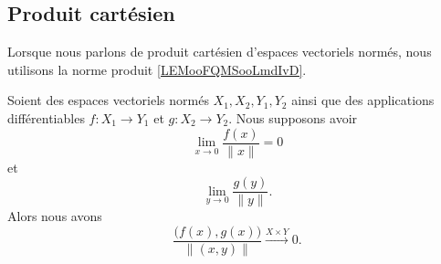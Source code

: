 \subsection{Produit cartésien}

Lorsque nous parlons de produit cartésien d'espaces vectoriels normés, nous utilisons la norme produit \ref{LEMooFQMSooLmdIvD}.

\begin{lemma}	\label{LEMooVFXXooAHjCzc}
	Soient des espaces vectoriels normés \( X_1, X_2,Y_1,Y_2\) ainsi que des applications différentiables \(f \colon X_1\to Y_1  \) et \(g \colon X_2\to Y_2  \). Nous supposons avoir
	\begin{equation}
		\lim_{x\to 0}\frac{ f(x) }{ \| x \| }=0
	\end{equation}
	et
	\begin{equation}
		\lim_{y\to 0}\frac{ g(y) }{ \| y \| }.
	\end{equation}
	Alors nous avons
	\begin{equation}
		\frac{ \big( f(x), g(x) \big) }{ \| (x,y) \| }\stackrel{ X\times Y}{\longrightarrow} 0.
	\end{equation}
\end{lemma}

